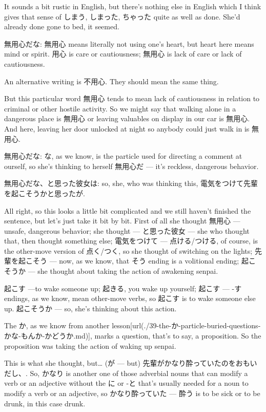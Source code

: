 It sounds a bit rustic in English, but there's nothing else in English which I think gives that sense of しまう, しまった, ちゃった quite as well as done. She'd already done gone to bed, it seemed.

無用心だな: 無用心 means literally not using one's heart, but heart here means mind or spirit. 用心 is care or cautiousness; 無用心 is lack of care or lack of cautiousness.

An alternative writing is 不用心. They should mean the same thing.

But this particular word 無用心 tends to mean lack of cautiousness in relation to criminal or other hostile activity. So we might say that walking alone in a dangerous place is 無用心 or leaving valuables on display in our car is 無用心. And here, leaving her door unlocked at night so anybody could just walk in is 無用心.

無用心だな: な, as we know, is the particle used for directing a comment at ourself, so she's thinking to herself 無用心だ --- it's reckless, dangerous behavior.

無用心だな、と思った彼女は: so, she, who was thinking this, 電気をつけて先輩を起こそうかと思ったが.

All right, so this looks a little bit complicated and we still haven't finished the sentence, but let's just take it bit by bit. First of all she thought 無用心 --- unsafe, dangerous behavior; she thought --- と思った彼女 --- she who thought that, then thought something else; 電気をつけて --- 点ける/つける, of course, is the other-move version of 点く/つく, so she thought of switching on the lights; 先輩を起こそう --- now, as we know, that そう ending is a volitional ending; 起こそうか --- she thought about taking the action of awakening senpai.

起こす ---to wake someone up; 起きる, you wake up yourself; 起こす --- -す endings, as we know, mean other-move verbs, so 起こす is to wake someone else up. 起こそうか --- so, she's thinking about this action.

{}

The か, as we know from another lesson\goto{{[}39{]}}[url(./39-the-か-particle-buried-questions-かな-もんか-かどうか.md)], marks a question, that's to say, a proposition. So the proposition was taking the action of waking up senpai.

This is what she thought, but\ldots{} (が --- but) 先輩がかなり酔っていたのをおもいだし、. So, かなり is another one of those adverbial nouns that can modify a verb or an adjective without the に or -と that's usually needed for a noun to modify a verb or an adjective, so かなり酔っていた --- 酔う is to be sick or to be drunk, in this case drunk.

